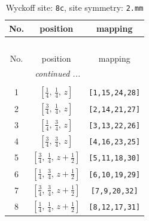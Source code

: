 \documentclass[fleqn,8pt]{jsarticle}
\begin{document}
\renewcommand{\arraystretch}{1.2}
\begin{longtable}{ccc}
\caption{Wyckoff site: {\tt 8c}, site symmetry: {\tt 2.mm}}
 \\
 \hline \hline
No. & position & mapping \\ \hline \endfirsthead

\multicolumn{2}{l}{\tablename\ \thetable{}} \\
 \hline \hline
No. & position & mapping \\ \hline \endhead

 \hline \hline
\multicolumn{2}{r}{\footnotesize\it continued ...} \\ \endfoot

 \hline \hline
\multicolumn{2}{r}{} \\ \endlastfoot

1 & $\left[ \frac{1}{4},\, \frac{1}{4},\, z \right]$ & {\tt [1,15,24,28]} \\ \hline
2 & $\left[ \frac{3}{4},\, \frac{1}{4},\, z \right]$ & {\tt [2,14,21,27]} \\ \hline
3 & $\left[ \frac{1}{4},\, \frac{3}{4},\, z \right]$ & {\tt [3,13,22,26]} \\ \hline
4 & $\left[ \frac{3}{4},\, \frac{3}{4},\, z \right]$ & {\tt [4,16,23,25]} \\ \hline
5 & $\left[ \frac{3}{4},\, \frac{1}{4},\, z + \frac{1}{2} \right]$ & {\tt [5,11,18,30]} \\ \hline
6 & $\left[ \frac{1}{4},\, \frac{3}{4},\, z + \frac{1}{2} \right]$ & {\tt [6,10,19,29]} \\ \hline
7 & $\left[ \frac{3}{4},\, \frac{3}{4},\, z + \frac{1}{2} \right]$ & {\tt [7,9,20,32]} \\ \hline
8 & $\left[ \frac{1}{4},\, \frac{1}{4},\, z + \frac{1}{2} \right]$ & {\tt [8,12,17,31]} \\
\end{longtable}
\renewcommand{\arraystretch}{1.2}
\end{document}
